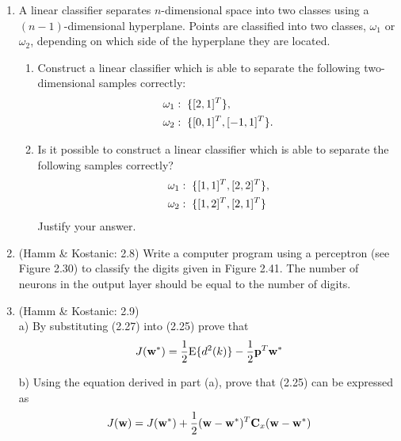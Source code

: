 \documentclass[10pt]{article}
\begin{document}
\begin{enumerate}
\vspace{2mm}
\item A linear classifier separates $n$-dimensional
space into two classes using a $(n-1)$-dimensional hyperplane. Points
are classified into two classes, $\omega_1$ or $\omega_2$, depending on
which side of the hyperplane they are located.
\begin{enumerate} \item Construct a linear classifier which is able to 
separate the following two-dimensional samples correctly:\\
\begin{align}
&\omega_1: \text{\;} \{[2,1]^T\}, \notag \\
&\omega_2: \text{\;} \{[0,1]^T, [-1,1]^T \}. \notag
\end{align}
\item Is it possible to construct a linear classifier which is able to
separate the following samples correctly? \\
\begin{align}
&\omega_1:\text{\;} \{ [1,1]^T, [2,2]^T \}, \notag \\
&\omega_2: \text{\;} \{ [1,2]^T,[2,1]^T \} \notag
\end{align}
Justify your answer. 
\end{enumerate} 

\vspace{2mm}
\item (Hamm \& Kostanic: 2.8) Write a computer program using a perceptron (see Figure 2.30) to
  classify the digits given in Figure 2.41. The number of neurons in
  the output layer should be equal to the number of digits.

\vspace{2mm}
\item (Hamm \& Kostanic: 2.9) \\

a) By substituting (2.27) into (2.25) prove
  that
\[
J ({\bf w}^*) = \frac{1}{2} \text{E}\lbrace d^2(k) \rbrace
- \frac{1}{2} {\bf p}^T{\bf w}^*
\]

b) Using the equation derived in part (a), prove that (2.25) can be
expressed as
\[
J ({\bf w}) = J ({\bf w}^*) + \frac{1}{2} ({\bf w}-{\bf
  w}^*)^T{\bf C}_x({\bf w} - {\bf w}^*)
\]

\end{enumerate}
\end{document}
